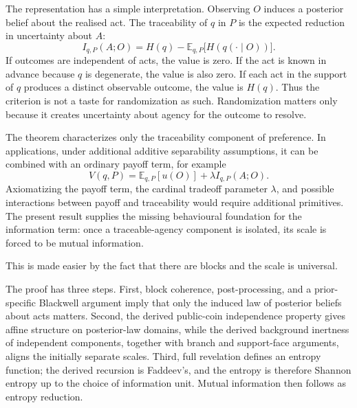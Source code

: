 \documentclass[11pt,a4paper]{article}
\theoremstyle{definition}
\newcommand{\E}{\mathbb E}
\newcommand{\1}{\mathbf 1}
\begin{document}
The representation has a simple interpretation.  Observing $O$ induces a posterior belief about the realised act.  The traceability of $q$ in $P$ is the expected reduction in uncertainty about $A$:
\[
I_{q,P}(A;O)
=
H(q)-\E_{q,P}\bigl[H(q(\cdot\mid O))\bigr].
\]
If outcomes are independent of acts, the value is zero.  If the act is known in advance because $q$ is degenerate, the value is also zero.  If each act in the support of $q$ produces a distinct observable outcome, the value is $H(q)$.  Thus the criterion is not a taste for randomization as such.  Randomization matters only because it creates uncertainty about agency for the outcome to resolve.

The theorem characterizes only the traceability component of preference.  In applications, under additional additive separability assumptions, it can be combined with an ordinary payoff term, for example
\[
V(q,P)=\E_{q,P}[u(O)]+\lambda I_{q,P}(A;O).
\]
Axiomatizing the payoff term, the cardinal tradeoff parameter $\lambda$, and possible interactions between payoff and traceability would require additional primitives.  The present result supplies the missing behavioural foundation for the information term: once a traceable-agency component is isolated, its scale is forced to be mutual information.

This is made easier by the fact that there are blocks and the scale is universal.

The proof has three steps.  First, block coherence, post-processing, and a prior-specific Blackwell argument imply that
only the induced law of posterior beliefs about acts matters.  Second, the derived public-coin independence property gives
affine structure on
posterior-law domains, while the derived background inertness of independent components, together with branch and
support-face arguments, aligns the initially separate scales.  Third,
full revelation defines an entropy function; the derived recursion is Faddeev's, and the entropy is therefore Shannon
entropy up to the choice of information unit.  Mutual information then follows as entropy reduction.
\end{document}

